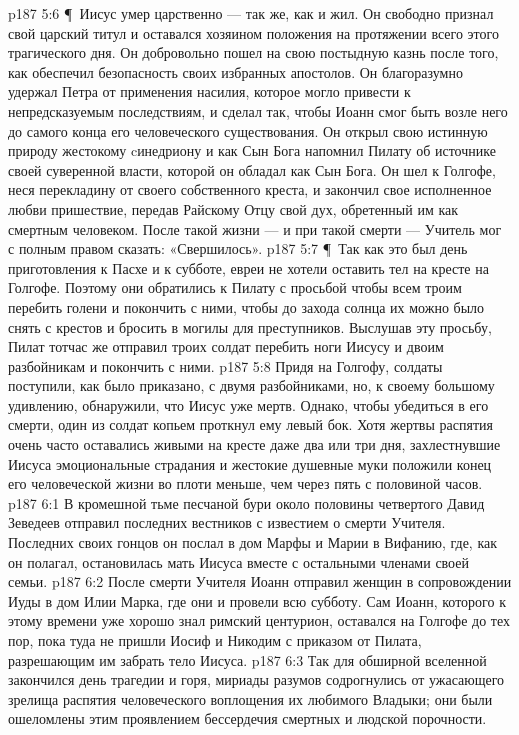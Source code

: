 \vs p187 5:6 \P\ Иисус умер царственно --- так же, как и жил. Он свободно признал свой царский титул и оставался хозяином положения на протяжении всего этого трагического дня. Он добровольно пошел на свою постыдную казнь после того, как обеспечил безопасность своих избранных апостолов. Он благоразумно удержал Петра от применения насилия, которое могло привести к непредсказуемым последствиям, и сделал так, чтобы Иоанн смог быть возле него до самого конца его человеческого существования. Он открыл свою истинную природу жестокому cинедриону и как Сын Бога напомнил Пилату об источнике своей суверенной власти, которой он обладал как Сын Бога. Он шел к Голгофе, неся перекладину от своего собственного креста, и закончил свое исполненное любви пришествие, передав Райскому Отцу свой дух, обретенный им как смертным человеком. После такой жизни --- и при такой смерти --- Учитель мог с полным правом сказать: «Свершилось».
\vs p187 5:7 \P\ Так как это был день приготовления к Пасхе и к субботе, евреи не хотели оставить тел на кресте на Голгофе. Поэтому они обратились к Пилату с просьбой чтобы всем троим перебить голени и покончить с ними, чтобы до захода солнца их можно было снять с крестов и бросить в могилы для преступников. Выслушав эту просьбу, Пилат тотчас же отправил троих солдат перебить ноги Иисусу и двоим разбойникам и покончить с ними.
\vs p187 5:8 Придя на Голгофу, солдаты поступили, как было приказано, с двумя разбойниками, но, к своему большому удивлению, обнаружили, что Иисус уже мертв. Однако, чтобы убедиться в его смерти, один из солдат копьем проткнул ему левый бок. Хотя жертвы распятия очень часто оставались живыми на кресте даже два или три дня, захлестнувшие Иисуса эмоциональные страдания и жестокие душевные муки положили конец его человеческой жизни во плоти меньше, чем через пять с половиной часов.
\vs p187 6:1 В кромешной тьме песчаной бури около половины четвертого Давид Зеведеев отправил последних вестников с известием о смерти Учителя. Последних своих гонцов он послал в дом Марфы и Марии в Вифанию, где, как он полагал, остановилась мать Иисуса вместе с остальными членами своей семьи.
\vs p187 6:2 После смерти Учителя Иоанн отправил женщин в сопровождении Иуды в дом Илии Марка, где они и провели всю субботу. Сам Иоанн, которого к этому времени уже хорошо знал римский центурион, оставался на Голгофе до тех пор, пока туда не пришли Иосиф и Никодим с приказом от Пилата, разрешающим им забрать тело Иисуса.
\vs p187 6:3 Так для обширной вселенной закончился день трагедии и горя, мириады разумов содрогнулись от ужасающего зрелища распятия человеческого воплощения их любимого Владыки; они были ошеломлены этим проявлением бессердечия смертных и людской порочности.
